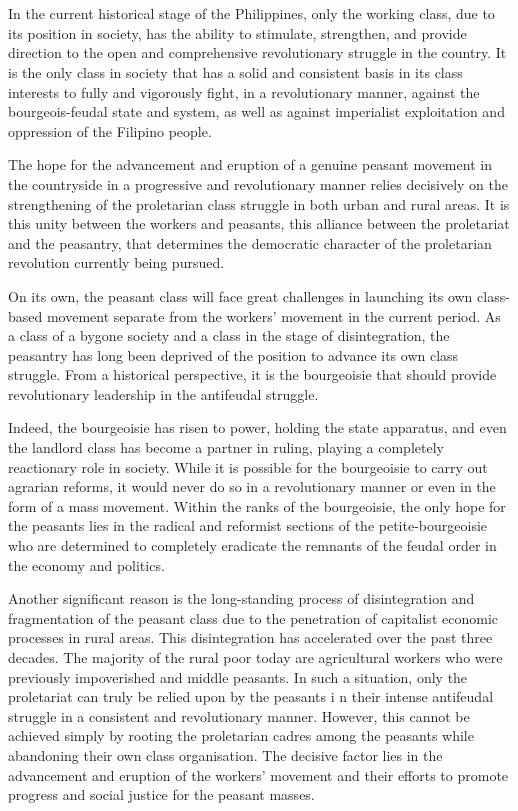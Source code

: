 \section{}
In the current historical stage of the Philippines, only the working class, 
due to its position in society, 
has the ability to stimulate, strengthen, and provide direction to 
the open and comprehensive revolutionary struggle in the country. 
It is the only class in society that has a solid and consistent basis 
in its class interests to fully and vigorously fight, in a revolutionary manner, 
against the bourgeois-feudal state and system, as well as against 
imperialist exploitation and oppression of the Filipino people.

The hope for the advancement and eruption of a genuine peasant movement 
in the countryside in a progressive and revolutionary manner relies 
decisively on the strengthening of the proletarian class struggle in 
both urban and rural areas. It is this unity between the workers and peasants, 
this alliance between the proletariat and the peasantry, 
that determines the democratic character of the proletarian revolution 
currently being pursued.

On its own, the peasant class will face great challenges in launching 
its own class-based movement separate from the workers' movement 
in the current period. 
As a class of a bygone society and a class in the stage of disintegration, 
the peasantry has long been deprived of the position to advance 
its own class struggle. 
From a historical perspective, 
it is the bourgeoisie that should provide revolutionary leadership 
in the antifeudal struggle.

Indeed, the bourgeoisie has risen to power, holding the state apparatus, 
and even the landlord class has become a partner in ruling, 
playing a completely reactionary role in society. 
While it is possible for the bourgeoisie to carry out agrarian reforms, 
it would never do so in a revolutionary manner or even in the form 
of a mass movement. 
Within the ranks of the bourgeoisie, the only hope for the peasants 
lies in the radical and reformist sections of the petite-bourgeoisie 
who are determined to completely eradicate the remnants of the feudal order 
in the economy and politics.

Another significant reason is the long-standing process of disintegration 
and fragmentation of the peasant class due to the penetration 
of capitalist economic processes in rural areas. 
This disintegration has accelerated over the past three decades. 
The majority of the rural poor today are agricultural workers 
who were previously impoverished and middle peasants. 
In such a situation, 
only the proletariat can truly be relied upon by the peasants i
n their intense antifeudal struggle in a consistent and revolutionary manner. 
However, this cannot be achieved simply by rooting the proletarian cadres 
among the peasants while abandoning their own class organisation. 
The decisive factor lies in the advancement and eruption of 
the workers' movement and their efforts to promote progress and 
social justice for the peasant masses.


